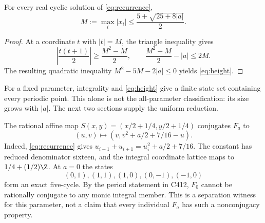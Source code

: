 \begin{lemma}
\label{lem:height}
For every real cyclic solution of \eqref{eq:recurrence},
\begin{equation}
 M:=\max_i|x_i|\le\frac{5+\sqrt{25+8|a|}}2.
 \label{eq:height}
\end{equation}
\end{lemma}
\begin{proof}
At a coordinate $t$ with $|t|=M$, the triangle inequality gives
\[
 \left|\frac{t(t+1)}2\right|\ge\frac{M^2-M}{2},
 \qquad
 \frac{M^2-M}{2}-|a|\le2M.
\]
The resulting quadratic inequality $M^2-5M-2|a|\le0$ yields
\eqref{eq:height}.
\end{proof}

For a fixed parameter, integrality and \eqref{eq:height} give a
finite state set containing every periodic point. This alone is not
the all-parameter classification: its size grows with $|a|$.
The next two sections supply the uniform reduction.

\begin{remark}
The rational affine map
$S(x,y)=(x/2+1/4,y/2+1/4)$ conjugates $F_a$ to
\[
 (u,v)\longmapsto(v,v^2+a/2+7/16-u).
\]
Indeed, \eqref{eq:recurrence} gives
$u_{i-1}+u_{i+1}=u_i^2+a/2+7/16$.
The constant has reduced denominator sixteen, and the integral
coordinate lattice maps to $1/4+(1/2)\Z$.
At $a=0$ the states
\[
 (0,1),(1,1),(1,0),(0,-1),(-1,0)
\]
form an exact five-cycle. By the period statement in C412,
$F_0$ cannot be rationally conjugate to any monic integral member.
This is a separation witness for this parameter, not a claim that
every individual $F_a$ has such a nonconjugacy property.
\end{remark}
